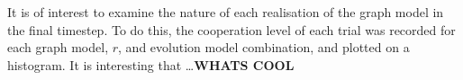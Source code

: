 It is of interest to examine the nature of each realisation of the graph model in the final timestep. To do this, the cooperation level of each trial was recorded for each graph model, $r$, and evolution model combination, and plotted on a histogram. It is interesting that \dots \textbf{WHATS COOL}

